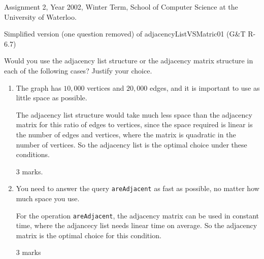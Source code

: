 \begin{usage}
Assignment 2, Year 2002, Winter Term, School of Computer Science at the University of Waterloo.
\end{usage}
\begin{authorship}
Simplified version (one question removed) of adjacencyListVSMatric01 (G\&T R-6.7)  
\end{authorship}

Would you use the adjacency list structure or the adjacency matrix
structure in each of the following cases?  
%
Justify your choice.


\begin{enumerate}

\item The graph has $10,000$ vertices and $20,000$ edges, and it is 
important to use as little space as possible.
\begin{solution}
The adjacency list structure would take much less space than the
adjacency matrix for this ratio of edges to vertices, since the space
required is linear is the number of edges and vertices, where the
matrix is quadratic in the number of vertices. So the adjacency list
is the optimal choice under these conditions.
\end{solution}
\begin{markingScheme}
$3$ marks.
\end{markingScheme}

\item You need to answer the query {\tt areAdjacent} as fast as
possible, no matter how much space you use.
\begin{solution}
For the operation {\tt areAdjacent}, the adjacency matrix can be used
in constant time, where the adjancecy list needs linear time on
average. 
%
So the adjacency matrix is the optimal choice for this condition.
\end{solution}
\begin{markingScheme}
$3$ marks
\end{markingScheme}

\end{enumerate}


